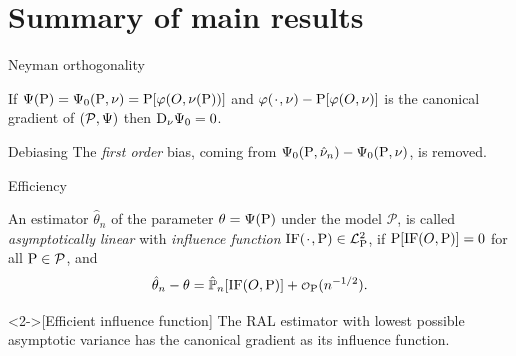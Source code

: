 \documentclass{beamer}\usepackage{listings}
\begin{document}
\section{Summary of main results}
\label{sec:org30881f3}
\begin{frame}[label={sec:org6029412}]{Neyman orthogonality}
\begin{theorem}
If $\TT(\P) = \TT_0(\P, \nu) = \P[\phi(O, \nu(\P))]$ and $\phi(\blank, \nu) - \P[\phi(O, \nu)]$ is the
canonical gradient of $(\mathcal{P}, \TT)$ then $\mathrm{D_{\nu}{\TT_0}} = 0$.

\hfill \pause
\end{theorem}

\begin{block}{Debiasing}
The \emph{first order} bias, coming from \(\TT_0(\P, \hat{\nu}_n) - \TT_0(\P, \nu)\), is removed. 
\end{block}
\end{frame}

\begin{frame}[label={sec:org2b01e4b}]{Efficiency}
\begin{definition}
An estimator $\hat{\theta}_n$ of the parameter $\theta = \TT(\P)$ under the model $\mathcal{P}$, is
called \textit{asymptotically linear} with \textit{influence function} $\ic(\blank, \P) \in \lp$, if 
$\P[\ic(O, \P)] = 0$ for all $\P \in \mathcal{P}$, and 
\begin{equation*}
  \hat{\theta}_n - \theta = \empmeas[\ic(O, \P)] + \smallO_{\P}(n^{-1/2}).
\end{equation*}
\end{definition}

\begin{theorem}<2->[Efficient influence function]
The RAL estimator with lowest possible asymptotic variance has the canonical gradient as its
influence function.
\end{theorem}
\end{frame}
\end{document}
